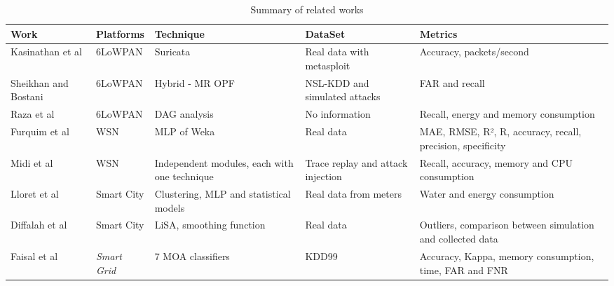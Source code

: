 \begin{table*}[htb]
	\caption{Summary of related works}
	\centering
	\begin{scriptsize}
		\begin{tabularx}{\textwidth}{l|l|X|X|X}	
			Work & Platforms & Technique & DataSet & Metrics\\
			\hline
			\hline
			Kasinathan et al\cite{dos-6lowpan-iot} & 6LoWPAN & Suricata & Real data with metasploit & Accuracy, packets/second\\
			\hline
			Sheikhan and Bostani\cite{Hybrid-ids-arch-iot} & 6LoWPAN & Hybrid - MR OPF & NSL-KDD and simulated attacks & FAR and recall\\
			\hline
			Raza et al\cite{SVELTE} & 6LoWPAN & DAG analysis & No information & Recall, energy and memory consumption\\
			\hline
			Furquim et al\cite{Fault-tolerance-disaster} & WSN & MLP of Weka & Real data & MAE, RMSE, R², R, accuracy, recall, precision, specificity\\
			\hline
			Midi et al\cite{Kalis} & WSN & Independent modules, each with one technique & Trace replay and attack injection & Recall, accuracy, memory and CPU consumption\\
			\hline
			Lloret et al\cite{IoT-arch-smartmeter} & Smart City & Clustering, MLP and statistical models & Real data from meters & Water and energy consumption\\
			\hline
			Diffalah et al\cite{scalable-anomaly-detection-smart-city} & Smart City & LiSA, smoothing function & Real data & Outliers, comparison between simulation and collected data\\
			\hline
			Faisal et al\cite{DS-based-IDS-SmartGrid} & \textit{Smart Grid} & 7 MOA classifiers & KDD99 & Accuracy, Kappa, memory consumption, time, FAR and FNR \\
			\hline
		\end{tabularx}
		\label{tab:summary}
	\end{scriptsize}
\end{table*}



